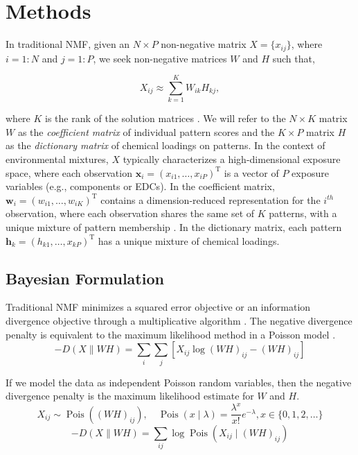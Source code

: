 \section{Methods}
\label{methods}
In traditional NMF, given an $N \times P$ non-negative matrix $X =\lbrace x_{i j}\rbrace $, where $i = 1:N$ and $j = 1:P$, we seek non-negative matrices $W$ and $H$ such that,

\begin{equation}
\label{nmf_trad}
X_{i j} \approx \sum^K_{k=1} W_{i k} H_{k j},
\end{equation}

where $K$ is the rank of the solution matrices \citep{lee1999learning}. We will refer to the $N \times K$ matrix $W$ as the \textit{coefficient matrix} of individual pattern scores and the $K \times P$ matrix $H$ as the \textit{dictionary matrix} of chemical loadings on patterns. In the context of environmental mixtures, $X$ typically characterizes a high-dimensional exposure space, where each observation $\mathbf{x}_{i}=\left(x_{i 1}, \ldots, x_{i P}\right)^{\mathrm{T}}$ is a vector of $P$ exposure variables (e.g., \PM components or EDCs). In the coefficient matrix, $\mathbf{w}_{i}=\left(w_{i 1}, \ldots, w_{i K}\right)^{\mathrm{T}}$ contains a dimension-reduced representation for the $i^{th}$ observation, where each observation  shares the same set of $K$ patterns, with a unique mixture of pattern membership \citep{wang2012nonnegative}. In the dictionary matrix, each pattern $\mathbf{h}_{k}=\left(h_{k 1}, \ldots, x_{k P}\right)^{\mathrm{T}}$ has a unique mixture of chemical loadings.

\subsection{Bayesian Formulation}
\label{methods_bayesian}
Traditional NMF minimizes a squared error objective or an information divergence objective through a multiplicative algorithm \citep{lee1999learning}. The negative divergence penalty is equivalent to the maximum likelihood method in a Poisson model \citep{cemgil2008bayesian,virtanen2008bayesian}.
\begin{equation}
-D(X \| W H)=\sum_{i} \sum_{j}\left[X_{i j} \log (W H)_{i j}-(W H)_{i j}\right]
\end{equation}

If we model the data as independent Poisson random variables, then the negative divergence penalty is the maximum likelihood estimate for $W$ and $H$.
\begin{equation*}
X_{i j} \sim \operatorname{Pois}\left((W H)_{i j}\right), \quad \operatorname{Pois}(x \mid \lambda)=\frac{\lambda^{x}}{x !} e^{-\lambda}, x \in\{0,1,2, \ldots\}
\end{equation*}
\vspace{-5ex}
\begin{equation}
-D(X \| W H) =\sum_{i j} \log \operatorname{Pois}\left(X_{i j} \mid(W H)_{i j}\right)
\end{equation}

